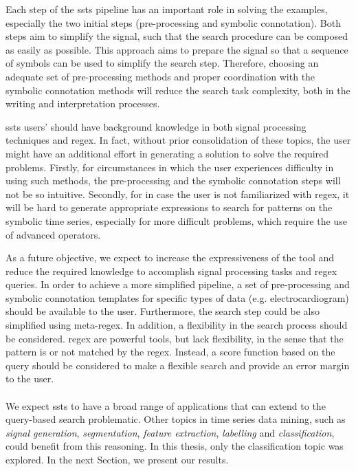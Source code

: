 Each step of the \gls{ssts} pipeline has an important role in solving the examples, especially the two initial steps (pre-processing and symbolic connotation). Both steps aim to simplify the signal, such that the search procedure can be composed as easily as possible. This approach aims to prepare the signal so that a sequence of symbols can be used to simplify the search step. Therefore, choosing an adequate set of pre-processing methods and proper coordination with the symbolic connotation methods will reduce the search task complexity, both in the writing and interpretation processes.
\par
\gls{ssts} users' should have background knowledge in both signal processing techniques and \gls{regex}. In fact, without prior consolidation of these topics, the user might have an additional effort in generating a solution to solve the required problems. Firstly, for circumstances in which the user experiences difficulty in using such methods, the pre-processing and the symbolic connotation steps will not be so intuitive. Secondly, for in case the user is not familiarized with \gls{regex}, it will be hard to generate appropriate expressions to search for patterns on the symbolic time series, especially for more difficult problems, which require the use of advanced operators.
\par
As a future objective, we expect to increase the expressiveness of the tool and reduce the required knowledge to accomplish signal processing tasks and \gls{regex} queries. In order to achieve a more simplified pipeline, a set of pre-processing and symbolic connotation templates for specific types of data (e.g. electrocardiogram) should be available to the user. Furthermore, the search step could be also simplified using meta-\gls{regex}. In addition, a flexibility in the search process should be considered. \gls{regex} are powerful tools, but lack flexibility, in the sense that the pattern is or not matched by the \gls{regex}. Instead, a score function based on the query should be considered to make a flexible search and provide an error margin to the user.\\\\

We expect \gls{ssts} to have a broad range of applications that can extend to the query-based search problematic. Other topics in time series data mining, such as \textit{signal generation}, \textit{segmentation}, \textit{feature extraction}, \textit{labelling} and \textit{classification}, could benefit from this reasoning. In this thesis, only the classification topic was explored. In the next Section, we present our results.

